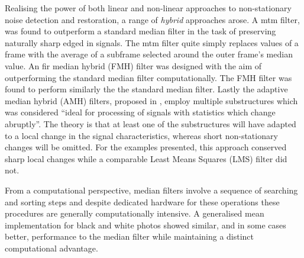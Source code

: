 Realising the power of both linear and non-linear approaches to non-stationary noise detection and restoration, a range of \emph{hybrid} approaches arose\cite{Nieminen1987a}\cite{Lee1985}\cite{Heinonen1987}. A \gls{mtm} filter, was found to outperform a standard median filter in the task of preserving naturally sharp edged in signals\cite{Lee1985}. The \gls{mtm} filter quite simply replaces values of a frame with the average of a subframe selected around the outer frame's median value\cite{Lee1985}. An \gls{fir} median hybrid (FMH) filter was designed with the aim of outperforming the standard median filter computationally. The FMH filter was found to perform similarly the the standard median filter\cite{Heinonen1987}. Lastly the adaptive median hybrid (AMH) filters, proposed in \cite{Nieminen1987a}, employ multiple substructures which was considered ``ideal for processing of signals with statistics which change abruptly''. The theory is that at least one of the substructures will have adapted to a local change in the signal characteristics, whereas short non-stationary changes will be omitted. For the examples presented, this approach conserved sharp local changes while a comparable Least Means Squares (LMS) filter did not\cite{Nieminen1987a}.

From a computational perspective, median filters involve a sequence of searching and sorting steps and despite dedicated hardware for these operations these procedures are generally computationally intensive\cite{Kundu1984}. A generalised mean implementation for black and white photos showed similar, and in some cases better, performance to the median filter while maintaining a distinct computational advantage\cite{Kundu1984}.




